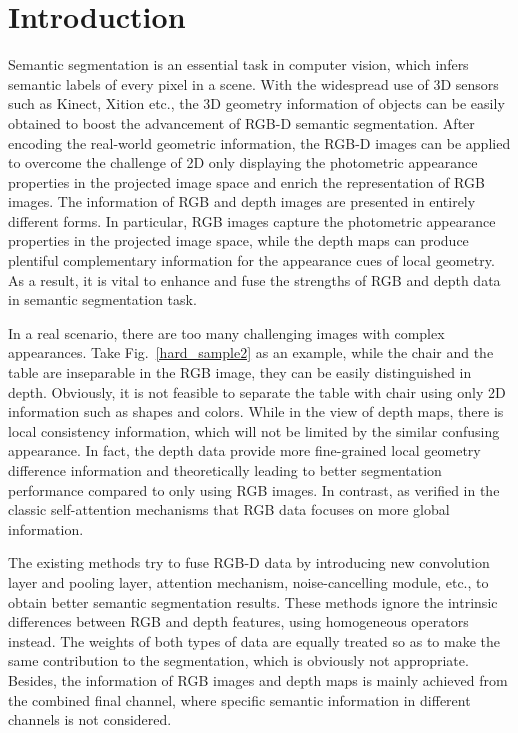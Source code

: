 \documentclass[10pt,twocolumn,letterpaper]{article}
\begin{document}
\section{Introduction}
Semantic segmentation is an essential task in computer vision, which infers semantic labels of every pixel in a scene.
With the widespread use of 3D sensors such as Kinect, Xition etc., the 3D geometry information of objects can be easily
obtained to boost the advancement of RGB-D semantic segmentation. After encoding the real-world geometric information,
the RGB-D images can be applied to overcome the challenge of 2D only displaying the photometric appearance properties
in the projected image space and enrich the representation of RGB images. The information of RGB and depth images are
presented in entirely different forms. In particular, RGB images capture the photometric appearance properties in the
projected image space, while the depth maps can produce plentiful complementary information for the appearance cues
of local geometry. As a result, it is vital to enhance and fuse the strengths of RGB and depth data in semantic
segmentation task.

In a real scenario, there are too many challenging images with complex appearances.
Take Fig.~\ref{hard_sample2} as an example, while
the chair and the table are inseparable in the RGB image, they can be easily distinguished in depth. Obviously, it is
not feasible to separate the table with chair using only 2D information such as shapes and colors.
While in the view of depth maps, there is local consistency information, which will not be limited by the similar confusing
appearance. In fact, the
depth data provide more fine-grained local geometry difference information and theoretically leading to better segmentation performance compared to only using RGB images. In contrast, as verified in the classic self-attention \cite{wang2018non,zhu2019asymmetric,zhang2019self} mechanisms that RGB data focuses on more global information.


The existing methods \cite{cao2021shapeconv,chen2020bi,chen2021spatial,mei2021depth,he2017std2p,husain2016combining,
   jiang2018rednet,cheng2017locality,lin2017cascaded, park2017rdfnet} try to fuse RGB-D data by introducing new convolution
layer and pooling layer, attention mechanism, noise-cancelling module, etc., to obtain better semantic segmentation results.
These methods ignore the intrinsic differences between RGB and depth features, using homogeneous operators instead.
The weights of both types of data are equally treated so as to make
the same contribution to the segmentation, which is obviously not appropriate. Besides, the information of RGB
images and depth maps is mainly achieved from the combined final channel, where specific semantic information in
different channels is not considered.
\end{document}
